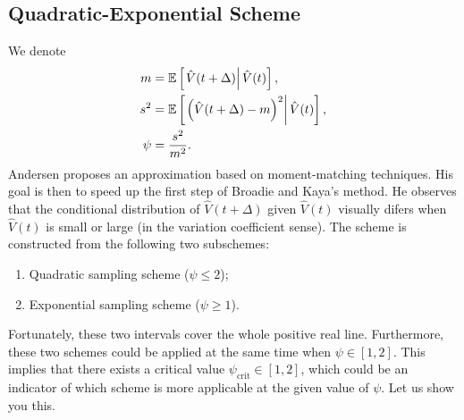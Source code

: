         \subsection{Quadratic-Exponential Scheme}
            We denote 
            \begin{align}
                m    &= \mathbb{E}\left[\left.\hat{V}(t+\Delta)\right| \hat{V}(t)\right], \label{Andersen:mean}\\
                s^2  &= \mathbb{E}\left[\left.\left(\hat{V}(t+\Delta) - m\right)^2\right| \hat{V}(t)\right], \\
                \psi &= \frac{s^2}{m^2}.\label{Andersen:CV}
            \end{align}
            Andersen proposes an approximation based on moment-matching techniques. His goal is then to speed up the first step of Broadie and Kaya's method.
            He observes that the conditional distribution of $\hat{V}(t+\Delta)$ given $\hat{V}(t)$ visually difers when $\hat{V}(t)$ is small or large (in the variation coefficient sense).
            The scheme is constructed from the following two subschemes:
            \begin{enumerate}
                \item Quadratic sampling scheme ($\psi \leq 2$);
                \item Exponential sampling scheme ($\psi \geq 1$).
            \end{enumerate}
            Fortunately, these two intervals cover the whole positive real line. Furthermore, these two schemes could be applied at the same time when $\psi\in[1, 2]$. This implies that there exists a critical value $\psi_{\text{crit}}\in[1, 2]$, which could be an indicator of which scheme is more applicable at the given value of $\psi$. Let us show you this.

